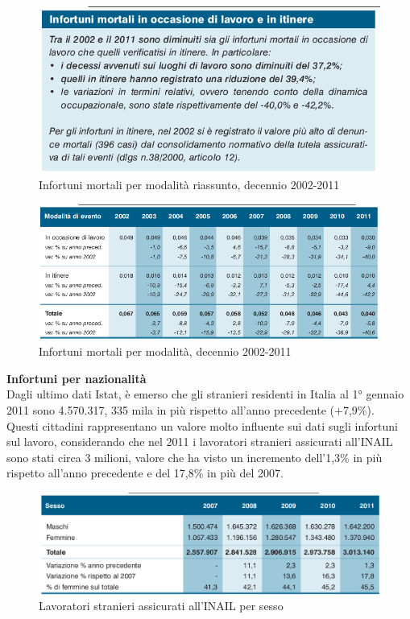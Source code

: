 \begin{figure}[H]
\centering
\includegraphics[scale=0.55]{images/cap4/analisiDiMercato/infortuniDecennioMortaliPerModalita1}
\caption{Infortuni mortali per modalità riassunto, decennio 2002-2011}
\end{figure}

\begin{figure}[H]
\centering
\includegraphics[scale=0.65]{images/cap4/analisiDiMercato/infortuniDecennioMortaliPerModalita2}
\caption{Infortuni mortali per modalità, decennio 2002-2011}
\end{figure}



\textbf{Infortuni per nazionalità}\\
Dagli ultimo dati Istat, è emerso che gli stranieri residenti in Italia al 1° gennaio 2011 sono
4.570.317, 335 mila in più rispetto all’anno precedente (+7,9\%).\\
Questi cittadini rappresentano un valore molto influente sui dati sugli infortuni sul lavoro, considerando che nel 2011 i lavoratori stranieri assicurati all’INAIL sono stati circa 3 milioni, valore che ha visto un incremento dell’1,3\% in più rispetto all'anno precedente e del 17,8\% in più del 2007.\\


\begin{figure}[H]
\centering
\includegraphics[scale=0.55]{images/cap4/analisiDiMercato/lavoratoriStranieri1}
\caption{Lavoratori stranieri assicurati all’INAIL per sesso}
\end{figure}

